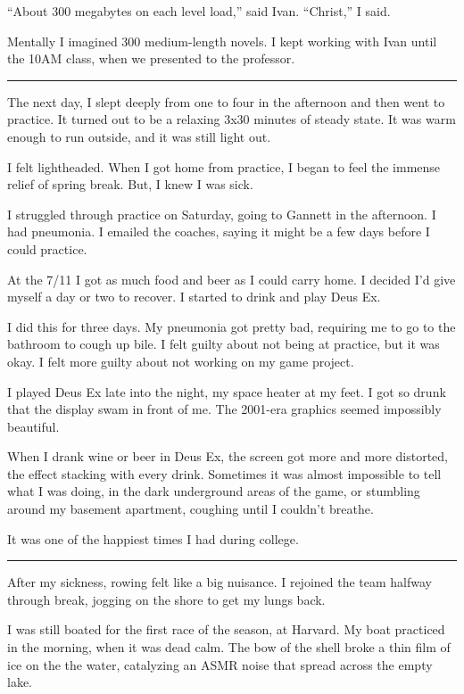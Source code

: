 ``About 300 megabytes on each level load,'' said Ivan.  ``Christ,'' I said.

Mentally I imagined 300 medium-length novels.  I kept working with Ivan until
the 10AM class, when we presented to the professor.

\plainfancybreak{12pt}{2}{* * *}

The next day, I slept deeply from one to four in the afternoon and then went to
practice.  It turned out to be a relaxing 3x30 minutes of steady state.  It
was warm enough to run outside, and it was still light out.

I felt lightheaded.  When I got home from practice, I began to feel the immense
relief of spring break.  But, I knew I was sick.  

I struggled through practice on Saturday, going to Gannett in the afternoon.  I
had pneumonia.  I emailed the coaches, saying it might be a few days before I
could practice.  

At the 7/11 I got as much food and beer as I could carry home.  I decided I'd
give myself a day or two to recover.  I started to drink and play Deus Ex.  

I did this for three days.  My pneumonia got pretty bad, requiring me to go to
the bathroom to cough up bile.  I felt guilty about not being at practice, but
it was okay.  I felt more guilty about not working on my game project. 
 
I played Deus Ex late into the night, my space heater at my feet.  I got so
drunk that the display swam in front of me.  The 2001-era graphics seemed
impossibly beautiful.  

When I drank wine or beer in Deus Ex, the screen got more and more distorted,
the effect stacking with every drink.  Sometimes it was almost impossible to
tell what I was doing, in the dark underground areas of the game, or stumbling
around my basement apartment, coughing until I couldn't breathe.

It was one of the happiest times I had during college.

\plainfancybreak{12pt}{2}{* * *}

After my sickness, rowing felt like a big nuisance.  I rejoined the team halfway
through break, jogging on the shore to get my lungs back.  

I was still boated for the first race of the season, at Harvard.  My boat
practiced in the morning, when it was dead calm.  The bow of the shell broke a
thin film of ice on the the water, catalyzing an ASMR noise that spread across
the empty lake.   

